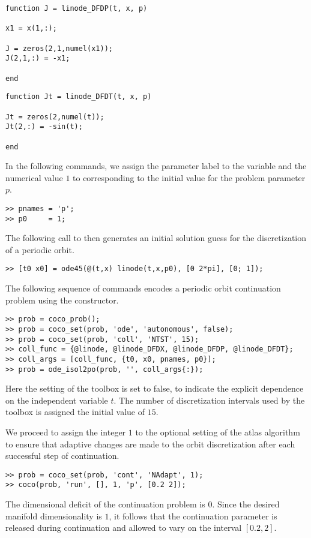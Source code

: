\begin{lstlisting}[language=coco-highlight]
function J = linode_DFDP(t, x, p)

x1 = x(1,:);

J = zeros(2,1,numel(x1));
J(2,1,:) = -x1;

end
\end{lstlisting}

\begin{lstlisting}[language=coco-highlight]
function Jt = linode_DFDT(t, x, p)

Jt = zeros(2,numel(t));
Jt(2,:) = -sin(t);

end
\end{lstlisting}

In the following commands, we assign the parameter label  to the  variable and the numerical value $1$ to  corresponding to the initial value for the problem parameter $p$. 
\begin{lstlisting}[language=coco-highlight]
>> pnames = 'p';
>> p0     = 1;
\end{lstlisting}
The following call to  then generates an initial solution guess for the discretization of a periodic orbit.
\begin{lstlisting}[language=coco-highlight]
>> [t0 x0] = ode45(@(t,x) linode(t,x,p0), [0 2*pi], [0; 1]);
\end{lstlisting}
The following sequence of commands encodes a periodic orbit continuation problem using the  constructor.
\begin{lstlisting}[language=coco-highlight]
>> prob = coco_prob();
>> prob = coco_set(prob, 'ode', 'autonomous', false);
>> prob = coco_set(prob, 'coll', 'NTST', 15);
>> coll_func = {@linode, @linode_DFDX, @linode_DFDP, @linode_DFDT};
>> coll_args = [coll_func, {t0, x0, pnames, p0}];
>> prob = ode_isol2po(prob, '', coll_args{:});
\end{lstlisting}
Here the  setting of the  toolbox is set to false, to indicate the explicit dependence on the independent variable $t$. The number of discretization intervals used by the  toolbox is assigned the initial value of $15$.

We proceed to assign the integer $1$ to the optional  setting of the atlas algorithm to ensure that adaptive changes are made to the orbit discretization after each successful step of continuation.
\begin{lstlisting}[language=coco-highlight]
>> prob = coco_set(prob, 'cont', 'NAdapt', 1);
>> coco(prob, 'run', [], 1, 'p', [0.2 2]);
\end{lstlisting}
The dimensional deficit of the continuation problem is $0$. Since the desired manifold dimensionality is $1$, it follows that the continuation parameter  is released during continuation and allowed to vary on the interval $[0.2,2]$.


